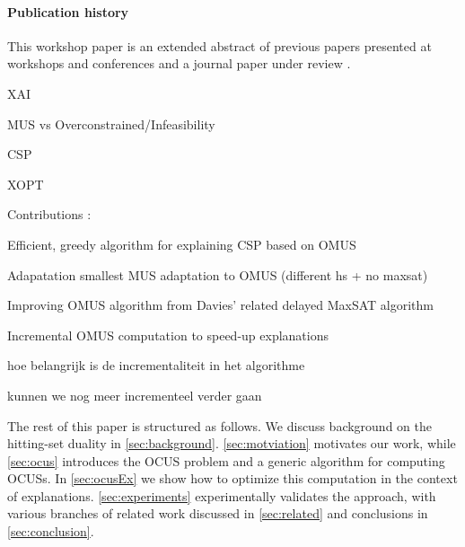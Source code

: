 {{\paragraph*{Publication history} This workshop paper is an extended abstract of previous papers presented at workshops and conferences \cite{claesuser,DBLP:conf/bnaic/ClaesBCGG19,ecai/BogaertsGCG20} and a journal paper under review \cite{bogaerts2020framework}.
}

\begin{compactenum}
    \item XAI
    \item MUS vs Overconstrained/Infeasibility
    \item CSP
    \item XOPT
\end{compactenum}

Contributions : 
\begin{compactenum}
    \item Efficient, greedy algorithm for explaining CSP based on OMUS 
    \item Adapatation smallest MUS adaptation to OMUS (different hs + no maxsat) 
    \item Improving OMUS algorithm from Davies' related delayed MaxSAT algorithm 
    \item Incremental OMUS computation to speed-up explanations
    \begin{compactitem}
        \item hoe belangrijk is de incrementaliteit in het algorithme
        \item kunnen  we nog meer incrementeel verder gaan
    \end{compactitem}
\end{compactenum}
}


The rest of this paper is structured as follows.
We discuss background on the hitting-set duality in \cref{sec:background}. \cref{sec:motviation} motivates our work, while \cref{sec:ocus} introduces the OCUS problem and a generic \hitsetbased algorithm for computing OCUSs. In \cref{sec:ocusEx} we show how to optimize this computation in the context of explanations. 
\cref{sec:experiments} experimentally validates the approach, %
with various branches of related work discussed in \cref{sec:related} and conclusions in \cref{sec:conclusion}.



